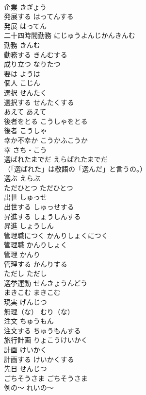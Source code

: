 \documentclass[8pt]{extreport}
\begin{document}
\begin{CJK}{UTF8}{min}
\\	企業	きぎょう	
\\	発展する	はってんする	
\\	発展	はってん	
\\	二十四時間勤務	にじゅうよんじかんきんむ	
\\	勤務	きんむ	
\\	勤務する	きんむする	
\\	成り立つ	なりたつ	
\\	要は	ようは	
\\	個人	こじん	
\\	選択	せんたく	
\\	選択する	せんたくする	
\\	あえて	あえて	
\\	後者をとる	こうしゃをとる	
\\	後者	こうしゃ	
\\	幸か不幸か	こうかふこうか	
\\	幸	さち・こう	
\\	選ばれたまでだ	えらばれたまでだ	
\\	（「選ばれた」は敬語の「選んだ」と言うの。）
\\	選ぶ	えらぶ	
\\	ただひとつ	ただひとつ	
\\	出世	しゅっせ	
\\	出世する	しゅっせする	
\\	昇進する	しょうしんする	
\\	昇進	しょうしん	
\\	管理職につく	かんりしょくにつく	
\\	管理職	かんりしょく	
\\	管理	かんり	
\\	管理する	かんりする	
\\	ただし	ただし	
\\	選挙運動	せんきょうんどう	
\\	まきこむ	まきこむ	
\\	現実	げんじつ	
\\	無理（な）	むり（な）	
\\	注文	ちゅうもん	
\\	注文する	ちゅうもんする	
\\	旅行計画	りょこうけいかく	
\\	計画	けいかく	
\\	計画する	けいかくする	
\\	先日	せんじつ	
\\	ごちそうさま	ごちそうさま	
\\	例の〜	れいの〜	

\end{CJK}
\end{document}
